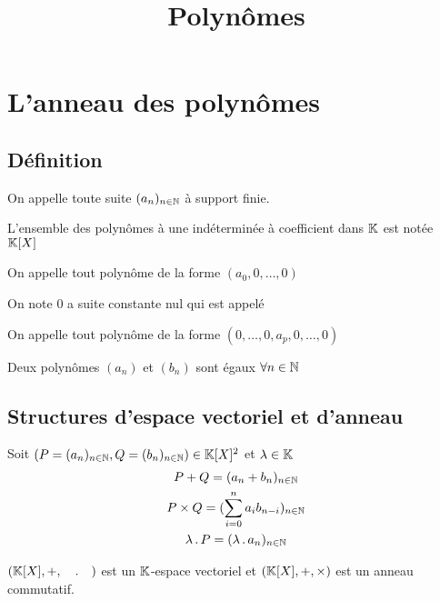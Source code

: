 

\title{Polynômes}



\section{L'anneau des polynômes}

\subsection{Définition}

\begin{dfn}
  On appelle  toute suite $(a_n)_{n \in \mathbb{N}}$
  à support finie.
\end{dfn}

\begin{dfn}
  L'ensemble des polynômes à une indéterminée à coefficient dans $\mathbb{K}$ est notée $\mathbb{K}[X]$ 

  On appelle  tout polynôme de la forme $(a_0, 0, \ldots, 0)$

  On note $0$ a suite constante nul qui est appelé 

  On appelle  tout polynôme de la forme $(0, \ldots, 0, a_p, 0, \ldots, 0)$

  Deux polynômes $(a_n)$ et $(b_n)$ sont égaux \ssi $\forall n \in \mathbb{N}$
\end{dfn}

\subsection{Structures d'espace vectoriel et d'anneau}

\begin{dfn}
  Soit $(P = (a_n)_{n \in \mathbb{N}}, Q = (b_n)_{n \in \mathbb{N}}) \in \mathbb{K}[X]^2$ et
  $\lambda \in \mathbb{K}$
  \begin{gather*}
    P + Q = (a_n + b_n)_{n \in \mathbb{N}} \\
    P \times Q = (\sum^n_{i = 0} a_i b_{n - i})_{n \in \mathbb{N}} \\
    \lambda \operatorname{.} P = (\lambda \operatorname{.} a_n)_{n \in \mathbb{N}}
  \end{gather*}
\end{dfn}

\begin{prp}
  $(\mathbb{K}[X], +, \quad \operatorname{.} \quad)$ est un $\mathbb{K}$-espace vectoriel et
  $(\mathbb{K}[X], +, \times)$ est un anneau commutatif.
\end{prp}

